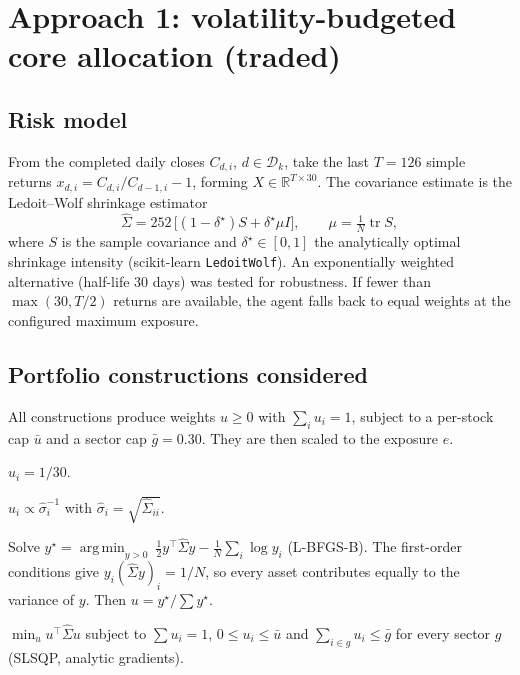 \documentclass[11pt,a4paper]{article}
\newcommand{\code}[1]{\texttt{#1}}
\newcommand{\R}{\mathbb{R}}
\DeclareMathOperator*{\argmin}{arg\,min}
\begin{document}
\section{Approach 1: volatility-budgeted core allocation (traded)}\label{sec:core}

\subsection{Risk model}
From the completed daily closes $C_{d,i}$, $d\in\mathcal D_k$, take the last $T=126$ simple returns
$x_{d,i}=C_{d,i}/C_{d-1,i}-1$, forming $X\in\R^{T\times30}$. The covariance estimate is the Ledoit--Wolf shrinkage
estimator
\begin{equation}
  \hat\Sigma = 252\,\big[(1-\delta^\star)S+\delta^\star\mu I\big],\qquad \mu=\tfrac1N\operatorname{tr}S,
\end{equation}
where $S$ is the sample covariance and $\delta^\star\in[0,1]$ the analytically optimal shrinkage intensity
(scikit-learn \code{LedoitWolf}). An exponentially weighted alternative (half-life 30 days) was tested for robustness.
If fewer than $\max(30,T/2)$ returns are available, the agent falls back to equal weights at the configured maximum exposure.

\subsection{Portfolio constructions considered}
All constructions produce weights $u\ge0$ with $\sum_i u_i=1$, subject to a per-stock cap $\bar u$ and a sector cap
$\bar g=0.30$. They are then scaled to the exposure $e$.
\begin{description}[style=nextline,leftmargin=1.2em]
  \item[Equal weight (production).] $u_i=1/30$.
  \item[Inverse volatility.] $u_i\propto\hat\sigma_i^{-1}$ with $\hat\sigma_i=\sqrt{\hat\Sigma_{ii}}$.
  \item[Risk parity (equal risk contribution).] Solve
        $y^\star=\argmin_{y>0}\ \tfrac12y^\top\hat\Sigma y-\tfrac1N\sum_i\log y_i$ (L-BFGS-B). The first-order conditions
        give $y_i(\hat\Sigma y)_i=1/N$, so every asset contributes equally to the variance of $y$. Then $u=y^\star/\sum y^\star$.
  \item[Minimum variance.] $\min_u u^\top\hat\Sigma u$ subject to $\sum u_i=1$, $0\le u_i\le\bar u$ and
        $\sum_{i\in g}u_i\le\bar g$ for every sector $g$ (SLSQP, analytic gradients).
\end{description}
\end{document}
